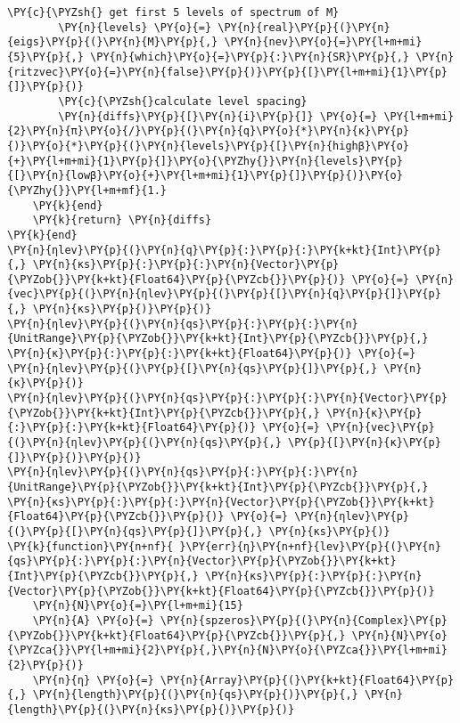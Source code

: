 \begin{Verbatim}[commandchars=\\\{\}]
        \PY{c}{\PYZsh{} get first 5 levels of spectrum of M}
        \PY{n}{levels} \PY{o}{=} \PY{n}{real}\PY{p}{(}\PY{n}{eigs}\PY{p}{(}\PY{n}{M}\PY{p}{,} \PY{n}{nev}\PY{o}{=}\PY{l+m+mi}{5}\PY{p}{,} \PY{n}{which}\PY{o}{=}\PY{p}{:}\PY{n}{SR}\PY{p}{,} \PY{n}{ritzvec}\PY{o}{=}\PY{n}{false}\PY{p}{)}\PY{p}{[}\PY{l+m+mi}{1}\PY{p}{]}\PY{p}{)}
        \PY{c}{\PYZsh{}calculate level spacing}
        \PY{n}{diffs}\PY{p}{[}\PY{n}{i}\PY{p}{]} \PY{o}{=} \PY{l+m+mi}{2}\PY{n}{π}\PY{o}{/}\PY{p}{(}\PY{n}{q}\PY{o}{*}\PY{n}{κ}\PY{p}{)}\PY{o}{*}\PY{p}{(}\PY{n}{levels}\PY{p}{[}\PY{n}{highβ}\PY{o}{+}\PY{l+m+mi}{1}\PY{p}{]}\PY{o}{\PYZhy{}}\PY{n}{levels}\PY{p}{[}\PY{n}{lowβ}\PY{o}{+}\PY{l+m+mi}{1}\PY{p}{]}\PY{p}{)}\PY{o}{\PYZhy{}}\PY{l+m+mf}{1.}
    \PY{k}{end}
    \PY{k}{return} \PY{n}{diffs}
\PY{k}{end}
\PY{n}{ηlev}\PY{p}{(}\PY{n}{q}\PY{p}{:}\PY{p}{:}\PY{k+kt}{Int}\PY{p}{,} \PY{n}{κs}\PY{p}{:}\PY{p}{:}\PY{n}{Vector}\PY{p}{\PYZob{}}\PY{k+kt}{Float64}\PY{p}{\PYZcb{}}\PY{p}{)} \PY{o}{=} \PY{n}{vec}\PY{p}{(}\PY{n}{ηlev}\PY{p}{(}\PY{p}{[}\PY{n}{q}\PY{p}{]}\PY{p}{,} \PY{n}{κs}\PY{p}{)}\PY{p}{)}
\PY{n}{ηlev}\PY{p}{(}\PY{n}{qs}\PY{p}{:}\PY{p}{:}\PY{n}{UnitRange}\PY{p}{\PYZob{}}\PY{k+kt}{Int}\PY{p}{\PYZcb{}}\PY{p}{,} \PY{n}{κ}\PY{p}{:}\PY{p}{:}\PY{k+kt}{Float64}\PY{p}{)} \PY{o}{=} \PY{n}{ηlev}\PY{p}{(}\PY{p}{[}\PY{n}{qs}\PY{p}{]}\PY{p}{,} \PY{n}{κ}\PY{p}{)}
\PY{n}{ηlev}\PY{p}{(}\PY{n}{qs}\PY{p}{:}\PY{p}{:}\PY{n}{Vector}\PY{p}{\PYZob{}}\PY{k+kt}{Int}\PY{p}{\PYZcb{}}\PY{p}{,} \PY{n}{κ}\PY{p}{:}\PY{p}{:}\PY{k+kt}{Float64}\PY{p}{)} \PY{o}{=} \PY{n}{vec}\PY{p}{(}\PY{n}{ηlev}\PY{p}{(}\PY{n}{qs}\PY{p}{,} \PY{p}{[}\PY{n}{κ}\PY{p}{]}\PY{p}{)}\PY{p}{)}
\PY{n}{ηlev}\PY{p}{(}\PY{n}{qs}\PY{p}{:}\PY{p}{:}\PY{n}{UnitRange}\PY{p}{\PYZob{}}\PY{k+kt}{Int}\PY{p}{\PYZcb{}}\PY{p}{,} \PY{n}{κs}\PY{p}{:}\PY{p}{:}\PY{n}{Vector}\PY{p}{\PYZob{}}\PY{k+kt}{Float64}\PY{p}{\PYZcb{}}\PY{p}{)} \PY{o}{=} \PY{n}{ηlev}\PY{p}{(}\PY{p}{[}\PY{n}{qs}\PY{p}{]}\PY{p}{,} \PY{n}{κs}\PY{p}{)}
\PY{k}{function}\PY{n+nf}{ }\PY{err}{η}\PY{n+nf}{lev}\PY{p}{(}\PY{n}{qs}\PY{p}{:}\PY{p}{:}\PY{n}{Vector}\PY{p}{\PYZob{}}\PY{k+kt}{Int}\PY{p}{\PYZcb{}}\PY{p}{,} \PY{n}{κs}\PY{p}{:}\PY{p}{:}\PY{n}{Vector}\PY{p}{\PYZob{}}\PY{k+kt}{Float64}\PY{p}{\PYZcb{}}\PY{p}{)}
    \PY{n}{N}\PY{o}{=}\PY{l+m+mi}{15}
    \PY{n}{A} \PY{o}{=} \PY{n}{spzeros}\PY{p}{(}\PY{n}{Complex}\PY{p}{\PYZob{}}\PY{k+kt}{Float64}\PY{p}{\PYZcb{}}\PY{p}{,} \PY{n}{N}\PY{o}{\PYZca{}}\PY{l+m+mi}{2}\PY{p}{,}\PY{n}{N}\PY{o}{\PYZca{}}\PY{l+m+mi}{2}\PY{p}{)}
    \PY{n}{η} \PY{o}{=} \PY{n}{Array}\PY{p}{(}\PY{k+kt}{Float64}\PY{p}{,} \PY{n}{length}\PY{p}{(}\PY{n}{qs}\PY{p}{)}\PY{p}{,} \PY{n}{length}\PY{p}{(}\PY{n}{κs}\PY{p}{)}\PY{p}{)}

\end{Verbatim}
